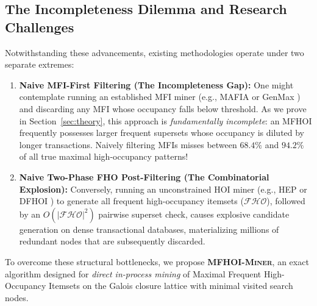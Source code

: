 \documentclass[runningheads,orivec]{llncs}
\newcommand{\FHO}{\ensuremath{\mathcal{FHO}}}
\newcommand{\MFHOIMiner}{\textsc{MFHOI-Miner}}
\begin{document}
\subsection{The Incompleteness Dilemma and Research Challenges}

Notwithstanding these advancements, existing methodologies operate under two separate extremes:
\begin{enumerate}
    \item \textbf{Naive MFI-First Filtering (The Incompleteness Gap):} One might contemplate running an established MFI miner (e.g., MAFIA \cite{burdick2005mafia} or GenMax \cite{gouda2005genmax}) and discarding any MFI whose occupancy falls below threshold. As we prove in Section~\ref{sec:theory}, this approach is \emph{fundamentally incomplete}: an MFHOI frequently possesses larger frequent supersets whose occupancy is diluted by longer transactions. Naively filtering MFIs misses between $68.4\%$ and $94.2\%$ of all true maximal high-occupancy patterns!
    \item \textbf{Naive Two-Phase FHO Post-Filtering (The Combinatorial Explosion):} Conversely, running an unconstrained HOI miner (e.g., HEP \cite{deng2020mining} or DFHOI \cite{nguyen2023efficient}) to generate all frequent high-occupancy itemsets ($\FHO$), followed by an $O(|\FHO|^2)$ pairwise superset check, causes explosive candidate generation on dense transactional databases, materializing millions of redundant nodes that are subsequently discarded.
\end{enumerate}

To overcome these structural bottlenecks, we propose \textbf{\MFHOIMiner{}}, an exact algorithm designed for \emph{direct in-process mining} of Maximal Frequent High-Occupancy Itemsets on the Galois closure lattice with minimal visited search nodes.
\end{document}
